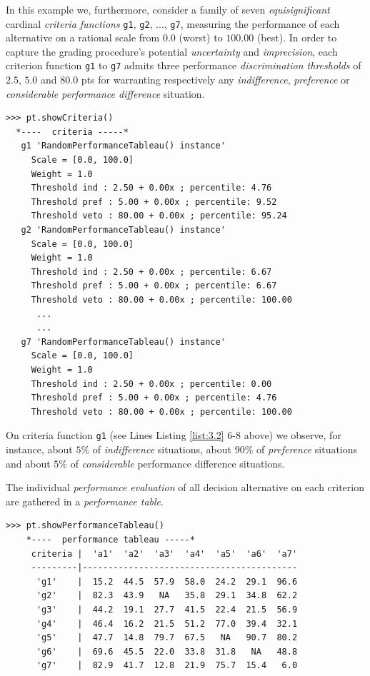 In this example we, furthermore, consider a family of seven \emph{equisignificant} cardinal \emph{criteria functions} \texttt{g1}, \texttt{g2}, ..., \texttt{g7}, measuring the performance of each alternative on a rational scale from $0.0$ (worst) to $100.00$ (best). In order to capture the grading procedure's potential \emph{uncertainty} and \emph{imprecision}, each criterion function \texttt{g1} to \texttt{g7} admits three performance \emph{discrimination thresholds} of $2.5$, $5.0$ and $80.0$ pts for warranting respectively any \emph{indifference}, \emph{preference} or \emph{considerable performance difference} situation.
\begin{lstlisting}[caption={Inspecting the performance criteria.},label=list:3.2]
>>> pt.showCriteria()
  *----  criteria -----*
   g1 'RandomPerformanceTableau() instance'
     Scale = [0.0, 100.0]
     Weight = 1.0
     Threshold ind : 2.50 + 0.00x ; percentile: 4.76
     Threshold pref : 5.00 + 0.00x ; percentile: 9.52
     Threshold veto : 80.00 + 0.00x ; percentile: 95.24
   g2 'RandomPerformanceTableau() instance'
     Scale = [0.0, 100.0]
     Weight = 1.0
     Threshold ind : 2.50 + 0.00x ; percentile: 6.67
     Threshold pref : 5.00 + 0.00x ; percentile: 6.67
     Threshold veto : 80.00 + 0.00x ; percentile: 100.00
      ...
      ...
   g7 'RandomPerformanceTableau() instance'
     Scale = [0.0, 100.0]
     Weight = 1.0
     Threshold ind : 2.50 + 0.00x ; percentile: 0.00
     Threshold pref : 5.00 + 0.00x ; percentile: 4.76
     Threshold veto : 80.00 + 0.00x ; percentile: 100.00
\end{lstlisting}
On criteria function \texttt{g1} (see Lines Listing \ref{list:3.2} 6-8 above) we observe, for instance, about $5\%$ of \emph{indifference} situations, about $90\%$ of \emph{preference} situations and about $5\%$ of \emph{considerable} performance difference situations.

The individual \emph{performance evaluation} of all decision alternative on each criterion are gathered in a \emph{performance table}.
\begin{lstlisting}[caption={Inspecting the performance table},label=list:3.3]
>>> pt.showPerformanceTableau()
    *----  performance tableau -----*
     criteria |  'a1'  'a2'  'a3'  'a4'  'a5'  'a6'  'a7'   
     ---------|------------------------------------------
      'g1'    |  15.2  44.5  57.9  58.0  24.2  29.1  96.6  
      'g2'    |  82.3  43.9   NA   35.8  29.1  34.8  62.2  
      'g3'    |  44.2  19.1  27.7  41.5  22.4  21.5  56.9  
      'g4'    |  46.4  16.2  21.5  51.2  77.0  39.4  32.1  
      'g5'    |  47.7  14.8  79.7  67.5   NA   90.7  80.2  
      'g6'    |  69.6  45.5  22.0  33.8  31.8   NA   48.8  
      'g7'    |  82.9  41.7  12.8  21.9  75.7  15.4   6.0  
\end{lstlisting}

